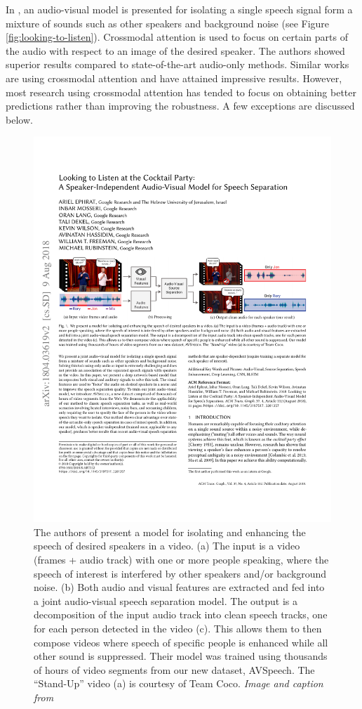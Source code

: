 In \citep{looking-to-listen}, an audio-visual model is presented for isolating a single speech signal form a mixture of sounds such as other speakers and background noise (see Figure \ref{fig:looking-to-listen}). Crossmodal attention is used to focus on certain parts of the audio with respect to an image of the desired speaker. The authors showed superior results compared to state-of-the-art audio-only methods. Similar works \citep{cross-transformer, crossmodal-object-detection, crossmodal-video-caption} are using crossmodal attention and have attained impressive results. However, most research using crossmodal attention has tended to focus on obtaining better predictions rather than improving the robustness. A few exceptions are discussed below.
\begin{figure}[!ht]
\centering
\includegraphics[scale=0.85]{figures/look-to-listen}
\caption[Looking to Listen framework]{The authors of \citep{looking-to-listen} present a model for isolating and enhancing the speech of desired speakers in a video. (a) The input is a video (frames + audio track) with one or more people speaking, where the speech of interest is interfered by other speakers and/or background noise. (b) Both audio and visual features are extracted and fed into a joint audio-visual speech separation model. The output is a decomposition of the input audio track into clean speech tracks, one for each person detected in the video (c). This allows them to then compose videos where speech of specific people is enhanced while all other sound is suppressed. Their model was trained using thousands of hours of video segments from our new dataset, AVSpeech. The “Stand-Up” video (a) is courtesy of Team Coco. \textit{Image and caption from} \citep{looking-to-listen}}

\end{figure}
